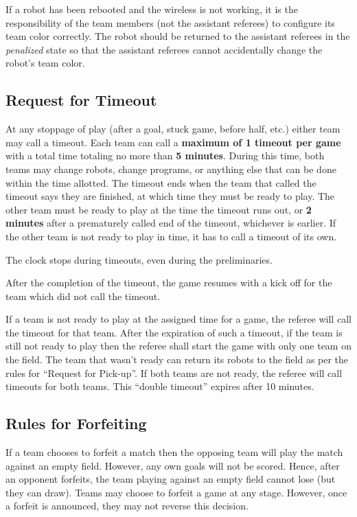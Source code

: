 \documentclass[12pt]{article}
\begin{document}
If a robot has been rebooted and the wireless is not working, it is the responsibility of the team members (not the assistant referees) to configure its team color correctly. The robot should be returned to the assistant referees in the \emph{penalized} state so that the assistant referees cannot accidentally change the robot's team color.

\subsection{Request for Timeout}
\label{sec:request_for_timeout}

At any stoppage of play (after a goal, stuck game, before half, etc.) either team may call a timeout. Each team can call a \textbf{maximum of 1 timeout per game} with a total time totaling no more than \textbf{5 minutes}. During this time, both teams may change robots, change programs, or anything else that can be done within the time allotted. 
The timeout ends when the team that called the timeout says they are finished, at which time they must be ready to play. The other team must be ready to play at the time the timeout runs out, or \textbf{2 minutes} after a prematurely called end of the timeout, whichever is earlier. If the other team is not ready to play in time, it has to call a timeout of its own.
  
The clock stops during timeouts, even during the preliminaries.

After the completion of the timeout, the game resumes with a kick off for the team which did not call the timeout.

If a team is not ready to play at the assigned time for a game, the referee will call the timeout for that team. After the expiration of such a timeout, if the team is still not ready to play then the referee shall start the game with only one team on the field.  The team that wasn't ready can return its robots to the field as per the rules for ``Request for Pick-up''. If both teams are not ready, the referee will call timeouts for both teams. This ``double timeout'' expires after 10 minutes.

\subsection{Rules for Forfeiting}
\label{sec:forfeit}

If a team chooses to forfeit a match then the opposing team will play the match against an empty field.  However, any own goals will not be scored.  Hence, after an opponent forfeits, the team playing against an empty field cannot lose (but they can draw).  Teams may choose to forfeit a game at any stage.  However, once a forfeit is announced, they may not reverse this decision.
\end{document}
